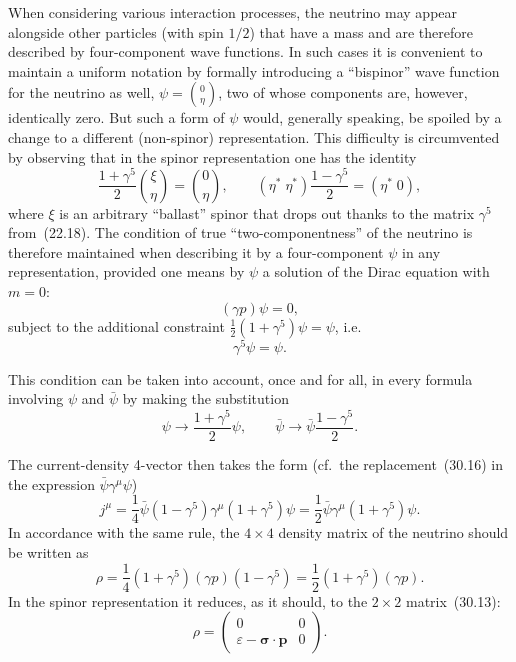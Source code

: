 When considering various interaction processes, the neutrino may appear alongside other particles (with spin $1/2$) that have a mass and are therefore described by four-component wave functions. In such cases it is convenient to maintain a uniform notation by formally introducing a ``bispinor'' wave function for the neutrino as well, $\psi = \binom{0}{\eta}$, two of whose components are, however, identically zero. But such a form of $\psi$ would, generally speaking, be spoiled by a change to a different (non-spinor) representation. This difficulty is circumvented by observing that in the spinor representation one has the identity
\[
\frac{1+\gamma^5}{2}\binom{\xi}{\eta} = \binom{0}{\eta},\qquad (\eta^*\;\eta^*)\frac{1-\gamma^5}{2} = (\eta^*\; 0),
\]
where $\xi$ is an arbitrary ``ballast'' spinor that drops out thanks to the matrix $\gamma^5$ from~(22.18). The condition of true ``two-componentness'' of the neutrino is therefore maintained when describing it by a four-component $\psi$ in any representation, provided one means by $\psi$ a solution of the Dirac equation with $m = 0$:
\begin{equation}
(\gamma p)\psi = 0,
\tag{30.14}
\end{equation}
subject to the additional constraint $\frac{1}{2}(1 + \gamma^5)\psi = \psi$, i.e.\
\begin{equation}
\gamma^5\psi = \psi.
\tag{30.15}
\end{equation}

This condition can be taken into account, once and for all, in every formula involving $\psi$ and $\bar\psi$ by making the substitution
\begin{equation}
\psi \to \frac{1+\gamma^5}{2}\psi,\qquad \bar\psi \to \bar\psi\frac{1-\gamma^5}{2}.
\tag{30.16}
\end{equation}

The current-density 4-vector then takes the form (cf.\ the replacement~(30.16) in the expression $\bar\psi\gamma^\mu\psi$)
\begin{equation}
j^\mu = \frac{1}{4}\bar\psi(1-\gamma^5)\gamma^\mu(1+\gamma^5)\psi = \frac{1}{2}\bar\psi\gamma^\mu(1+\gamma^5)\psi.
\tag{30.17}
\end{equation}
In accordance with the same rule, the $4 \times 4$ density matrix of the neutrino should be written as
\begin{equation}
\rho = \frac{1}{4}(1+\gamma^5)(\gamma p)(1-\gamma^5) = \frac{1}{2}(1+\gamma^5)(\gamma p).
\tag{30.18}
\end{equation}
In the spinor representation it reduces, as it should, to the $2 \times 2$ matrix~(30.13):
\[
\rho = \begin{pmatrix} 0 & 0\\ \varepsilon - \boldsymbol{\sigma}\cdot\mathbf{p} & 0 \end{pmatrix}.
\]

